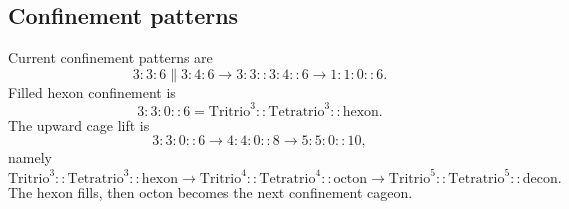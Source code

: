 \subsection{Confinement patterns}\label{subsec:cageon-confinement-patterns}
Current confinement patterns are
\[
3:3:6\parallel3:4:6
\rightarrow
3:3::3:4::6
\rightarrow
1:1:0::6.
\]
Filled hexon confinement is
\[
3:3:0::6
=
\mathrm{Tritrio}^{3}::\mathrm{Tetratrio}^{3}::\mathrm{hexon}.
\]
The upward cage lift is
\[
3:3:0::6
\rightarrow
4:4:0::8
\rightarrow
5:5:0::10,
\]
namely
\[
\mathrm{Tritrio}^{3}::\mathrm{Tetratrio}^{3}::\mathrm{hexon}
\rightarrow
\mathrm{Tritrio}^{4}::\mathrm{Tetratrio}^{4}::\mathrm{octon}
\rightarrow
\mathrm{Tritrio}^{5}::\mathrm{Tetratrio}^{5}::\mathrm{decon}.
\]
The hexon fills, then octon becomes the next confinement cageon.
